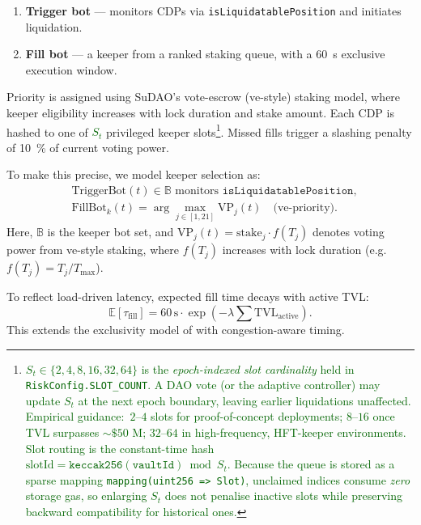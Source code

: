 \documentclass[11pt]{article}
\begin{document}
\begin{enumerate}[label=\textbf{\arabic*.},wide, labelindent=0pt]
  \item \textbf{Trigger bot} — monitors CDPs via \texttt{isLiquidatablePosition} and initiates liquidation.
  \item \textbf{Fill bot} — a keeper from a ranked staking queue, with a \SI{60}{\second} exclusive execution window.
\end{enumerate}

Priority is assigned using SuDAO's vote-escrow (ve-style) staking model, where keeper eligibility increases with lock duration and stake amount. 
Each CDP is hashed to one of \textcolor{darkgreen}{$S_{t}$} privileged keeper slots\footnote{\textcolor{darkgreen}{%
\(S_{t}\!\in\!\{2,4,8,16,32,64\}\) is the \emph{epoch-indexed slot cardinality} held in \texttt{RiskConfig.SLOT\_COUNT}.  
A DAO vote (or the adaptive controller) may update \(S_{t}\) at the next epoch boundary, leaving earlier liquidations unaffected. Empirical guidance: \(\,2{\text{–}}4\) slots for proof-of-concept deployments; \(8{\text{–}}16\) once TVL surpasses \(\sim\$50\) M; \(32{\text{–}}64\) in high-frequency, HFT-keeper environments.  Slot routing is the constant-time hash  
\(\mathrm{slotId}=\mathtt{keccak256(vaultId)}\bmod S_{t}\).  
Because the queue is stored as a sparse mapping \texttt{mapping(uint256~=>~Slot)}, unclaimed indices consume \emph{zero} storage gas, so enlarging \(S_{t}\) does not penalise inactive slots while preserving backward compatibility for historical ones.}}. Missed fills trigger a slashing penalty of \SI{10}{\percent} of current voting power.

\medskip

To make this precise, we model keeper selection as:
\begin{align*}
&\text{TriggerBot}(t) \in \mathbb{B} \text{ monitors } \texttt{isLiquidatablePosition}, \\
&\text{FillBot}_k(t) = \arg\max_{j \in[1,21]} \text{VP}_j(t) \quad \text{(ve-priority)}.
\end{align*}
Here, \( \mathbb{B} \) is the keeper bot set, and \( \text{VP}_j(t) = \text{stake}_j \cdot f(T_j) \) denotes voting power from ve-style staking, where \( f(T_j) \) increases with lock duration (e.g. \( f(T_j) = T_j / T_{\max} \)).

To reflect load-driven latency, expected fill time decays with active TVL:
\[
\mathbb{E}[\tau_{\text{fill}}] = 60\,\text{s} \cdot \exp\left(-\lambda \sum \text{TVL}_{\text{active}}\right).
\]
This extends the exclusivity model of \textcite{stableunit2025spec} with congestion-aware timing.
\end{document}
